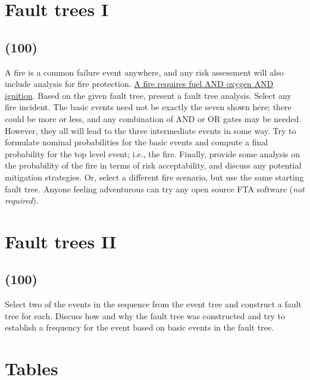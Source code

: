\documentclass[11pt,a4paper]{article}
\begin{document}
\newpage

\section{Fault trees I}
\subsection*{(100)}
A fire is a common failure event anywhere, and any risk assessment will also include analysis for fire protection. \href{https://images.sampletemplates.com/wp-content/uploads/2016/06/02114906/Fault-Tree-Analysis-Format.jpg}{A fire requires fuel AND oxygen AND ignition}. Based on the given fault tree, present a fault tree analysis. Select any fire incident. The basic events need not be exactly the seven shown here; there could be more or less, and any combination of AND or OR gates may be needed. However, they all will lead to the three intermediate events in some way. Try to formulate nominal probabilities for the basic events and compute a final probability for the top level event; i.e., the fire. Finally, provide some analysis on the probability of the fire in terms of risk acceptability, and discuss any potential mitigation strategies. Or, select a different fire scenario, but use the same starting fault tree. Anyone feeling adventurous can try any open source FTA software (\textit{not required}).
        
        
        
        
        
\newpage        
\section{Fault trees II}
\subsection*{(100)}
Select two of the events in the sequence from the event tree and construct a fault tree for each. Discuss how and why the fault tree was constructed and try to establish a frequency for the event based on basic events in the fault tree.





\newpage


\section*{Tables}
\end{document}
